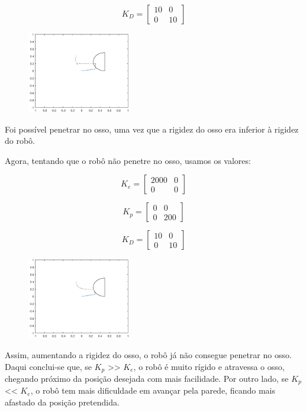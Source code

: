 \documentclass[a4paper,twocolumn,final,11pt]{article}
\begin{document}
\begin{equation}
K_D =
    \begin{bmatrix}
    10 & 0 \\
    0 & 10
    \end{bmatrix}
\end{equation}

\begin{figure}[H]
	\centering
	\includegraphics[width=0.4\textwidth]{neste_penetra_lol.eps}
	\caption{}
  \label{}
\end{figure}

Foi possível penetrar no osso, uma vez que a rigidez do osso era inferior à rigidez do robô.

Agora, tentando que o robô não penetre no osso, usamos os valores:

\begin{equation}
K_e =
    \begin{bmatrix}
    2000 & 0 \\
    0 & 0
    \end{bmatrix}
\end{equation}

\begin{equation}
K_p =
    \begin{bmatrix}
    0 & 0 \\
    0 & 200
    \end{bmatrix}
\end{equation}

\begin{equation}
K_D =
    \begin{bmatrix}
    10 & 0 \\
    0 & 10
    \end{bmatrix}
\end{equation}

\begin{figure}[H]
	\centering
	\includegraphics[width=0.4\textwidth]{8_naopenetra.eps}
	\caption{}
  \label{}
\end{figure}
Assim, aumentando a rigidez do osso, o robô já não consegue penetrar no osso. 
Daqui conclui-se que, se $K_p$ >> $K_e$, o robô é muito rígido e atravessa o osso, chegando próximo da posição desejada com mais facilidade.
Por outro lado, se $K_p$ << $K_e$, o robô tem mais dificuldade em avançar pela parede, ficando mais afastado da posição pretendida.
\end{document}
